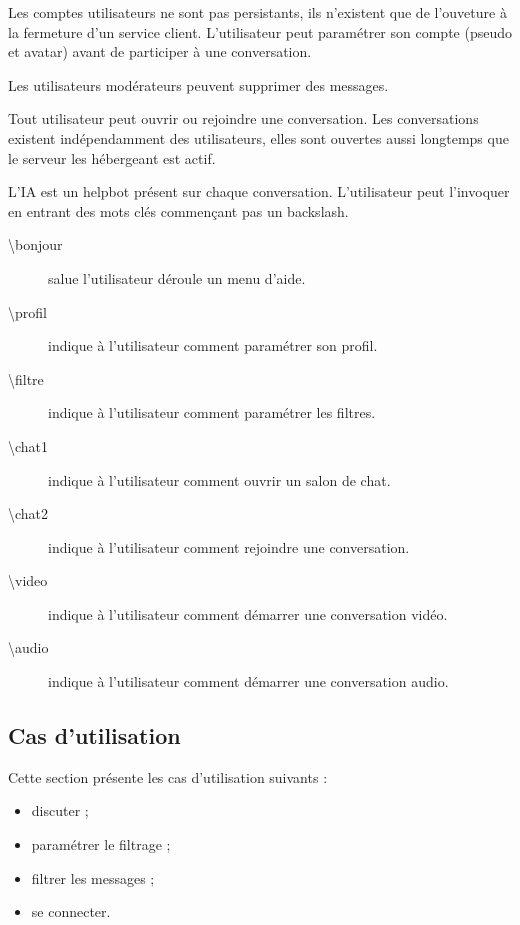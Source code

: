 \documentclass[11pt,dvipsnames,svgnames]{report}
\begin{document}
\begin{mdframed}[topline=false,rightline=false,bottomline=false, linewidth=3pt,linecolor=red]

Les comptes utilisateurs ne sont pas persistants, ils n'existent que de l'ouveture à la fermeture d'un service client. L'utilisateur peut paramétrer son compte (pseudo et avatar) avant de participer à une conversation.

Les utilisateurs modérateurs peuvent supprimer des messages.

Tout utilisateur peut ouvrir ou rejoindre une conversation. Les conversations existent indépendamment des utilisateurs, elles sont ouvertes aussi longtemps que le serveur les hébergeant est actif.

L'IA est un helpbot présent sur chaque conversation. L'utilisateur peut l'invoquer en entrant des mots clés commençant pas un backslash.
\begin{description}
\item[\textbackslash bonjour] salue l'utilisateur déroule un menu d'aide.
\item[\textbackslash profil] indique à l'utilisateur comment paramétrer son profil.
\item[\textbackslash filtre] indique à l'utilisateur comment paramétrer les filtres.
\item[\textbackslash chat1] indique à l'utilisateur comment ouvrir un salon de chat.
\item[\textbackslash chat2] indique à l'utilisateur comment rejoindre une conversation.
\item[\textbackslash video] indique à l'utilisateur comment démarrer une conversation vidéo.
\item[\textbackslash audio] indique à l'utilisateur comment démarrer une conversation audio.
\end{description}


\end{mdframed}

\subsection*{Cas d'utilisation}

Cette section présente les cas d'utilisation suivants :
\begin{itemize}
\item discuter ;
\item paramétrer le filtrage ;
\item filtrer les messages ;
\item se connecter.
\end{itemize}
\end{document}
